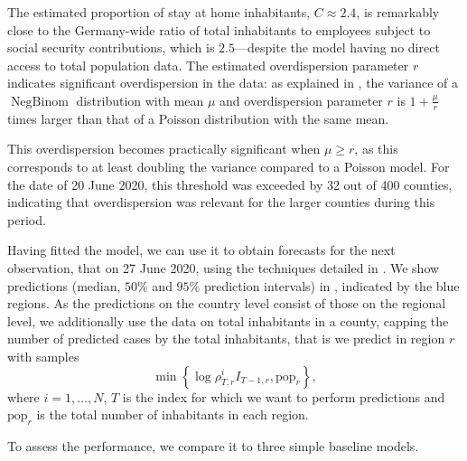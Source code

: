 The estimated proportion of stay at home inhabitants, $C \approx 2.4$, is remarkably close to the Germany-wide ratio of total inhabitants to employees subject to social security contributions, which is $2.5$—despite the model having no direct access to total population data. The estimated overdispersion parameter $r$ indicates significant overdispersion in the data: as explained in , the variance of a $\operatorname{NegBinom}$ distribution with mean $\mu$ and overdispersion parameter $r$ is $1 + \frac{\mu}{r}$ times larger than that of a Poisson distribution with the same mean. 

This overdispersion becomes practically significant when $\mu \geq r$, as this corresponds to at least doubling the variance compared to a Poisson model. For the date of 20 June 2020, this threshold was exceeded by 32 out of 400 counties, indicating that overdispersion was relevant for the larger counties during this period.

Having fitted the model, we can use it to obtain forecasts for the next observation, that on 27 June 2020, using the techniques detailed in . We show predictions (median, $50\%$ and $95\%$ prediction intervals) in , indicated by the blue regions. As the predictions on the country level consist of those on the regional level, we additionally use the data on total inhabitants in a county, capping the number of predicted cases by the total inhabitants, that is we predict in region $r$ with samples
$$
    \min \left\{\log \rho^{i}_{T,r}I_{T-1,r}, \text{pop}_{r}\right\},
$$
where $i=1,\dots,N$, $T$ is the index for which we want to perform predictions and $\text{pop}_{r}$ is the total number of inhabitants in each region.

To assess the performance, we compare it to three simple baseline models. 

